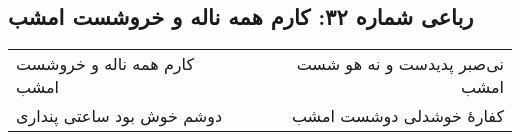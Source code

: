 \begin{center}
\section*{رباعی شماره ۳۲: کارم همه ناله و خروشست امشب}
\label{sec:sh032}
\begin{longtable}{l p{0.5cm} r}
کارم همه ناله و خروشست امشب
&&
نی‌صبر پدیدست و نه هو شست امشب
\\
دوشم خوش بود ساعتی پنداری
&&
کفارهٔ خوشدلی دوشست امشب
\\
\end{longtable}
\end{center}
